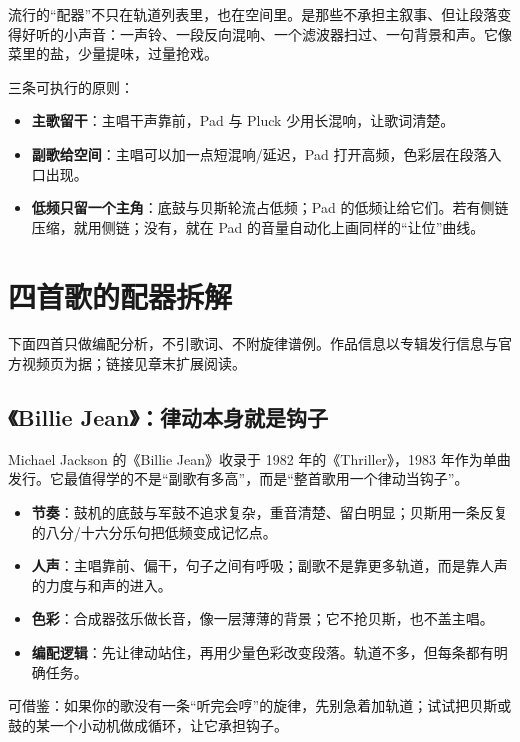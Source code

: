 流行的“配器”不只在轨道列表里，也在空间里。是那些不承担主叙事、但让段落变得好听的小声音：一声铃、一段反向混响、一个滤波器扫过、一句背景和声。它像菜里的盐，少量提味，过量抢戏。

三条可执行的原则：

\begin{itemize}
\item \textbf{主歌留干}：主唱干声靠前，Pad 与 Pluck 少用长混响，让歌词清楚。
\item \textbf{副歌给空间}：主唱可以加一点短混响/延迟，Pad 打开高频，色彩层在段落入口出现。
\item \textbf{低频只留一个主角}：底鼓与贝斯轮流占低频；Pad 的低频让给它们。若有侧链压缩，就用侧链；没有，就在 Pad 的音量自动化上画同样的“让位”曲线。
\end{itemize}

\section{四首歌的配器拆解}
\label{sec:pop-cases}

下面四首只做编配分析，不引歌词、不附旋律谱例。作品信息以专辑发行信息与官方视频页为据；链接见章末扩展阅读。

\subsection{《Billie Jean》：律动本身就是钩子}
\label{sec:pop-case-billie-jean}

Michael Jackson 的《Billie Jean》收录于 1982 年的《Thriller》，1983 年作为单曲发行。它最值得学的不是“副歌有多高”，而是“整首歌用一个律动当钩子”。

\begin{itemize}
\item \textbf{节奏}：鼓机的底鼓与军鼓不追求复杂，重音清楚、留白明显；贝斯用一条反复的八分/十六分乐句把低频变成记忆点。
\item \textbf{人声}：主唱靠前、偏干，句子之间有呼吸；副歌不是靠更多轨道，而是靠人声的力度与和声的进入。
\item \textbf{色彩}：合成器弦乐做长音，像一层薄薄的背景；它不抢贝斯，也不盖主唱。
\item \textbf{编配逻辑}：先让律动站住，再用少量色彩改变段落。轨道不多，但每条都有明确任务。
\end{itemize}

可借鉴：如果你的歌没有一条“听完会哼”的旋律，先别急着加轨道；试试把贝斯或鼓的某一个小动机做成循环，让它承担钩子。

